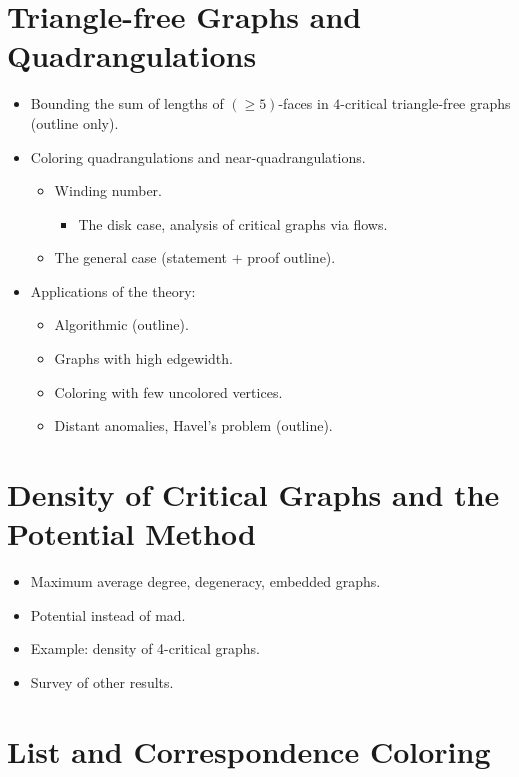 \documentclass[12pt,twoside,openright,a4paper]{book}
\begin{document}
\chapter{Triangle-free Graphs and Quadrangulations}
% 

\begin{itemize}
\item Bounding the sum of lengths of $(\ge\!5)$-faces in $4$-critical triangle-free graphs (outline only).
\item Coloring quadrangulations and near-quadrangulations.
\begin{itemize}
\item Winding number.
\begin{itemize}
\item The disk case, analysis of critical graphs via flows.
\end{itemize}
\item The general case (statement + proof outline).
\end{itemize}
\item Applications of the theory:
\begin{itemize}
\item Algorithmic (outline).
\item Graphs with high edgewidth.
\item Coloring with few uncolored vertices.
\item Distant anomalies, Havel's problem (outline).
\end{itemize}
\end{itemize}

\chapter{Density of Critical Graphs and the Potential Method}
% 

\begin{itemize}
\item Maximum average degree, degeneracy, embedded graphs.
\item Potential instead of mad.
\item Example: density of 4-critical graphs.
\item Survey of other results.
\end{itemize}

\chapter{List and Correspondence Coloring}
% 
\end{document}
